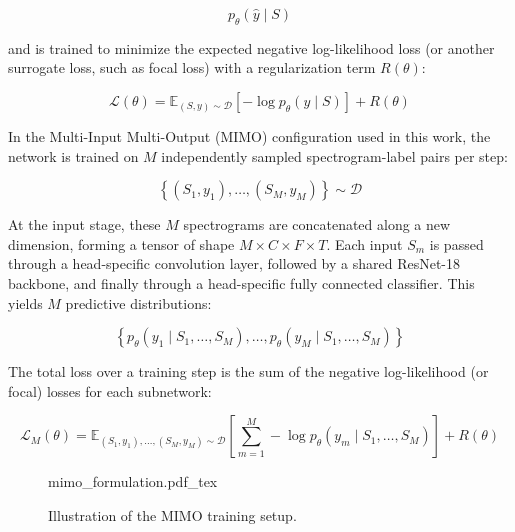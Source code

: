 \begin{equation}
p_{\theta}(\hat{y} \mid S)
\end{equation}

and is trained to minimize the expected negative log-likelihood loss (or another surrogate loss, such as focal loss) with a regularization term \( R(\theta) \):

\begin{equation}
\mathcal{L}(\theta) = \mathbb{E}_{(S, y) \sim \mathcal{D}} \left[ -\log p_{\theta}(y \mid S) \right] + R(\theta)
\end{equation}

In the Multi-Input Multi-Output (MIMO) configuration used in this work, the network is trained on \( M \) independently sampled spectrogram-label pairs per step:

\begin{equation}
\left\{(S_1, y_1), \ldots, (S_M, y_M)\right\} \sim \mathcal{D}
\end{equation}

At the input stage, these \( M \) spectrograms are concatenated along a new dimension, forming a tensor of shape \( M \times C \times F \times T \). Each input \( S_m \) is passed through a head-specific convolution layer, followed by a shared ResNet-18 backbone, and finally through a head-specific fully connected classifier. This yields \( M \) predictive distributions:

\begin{equation}
\left\{p_{\theta}(y_1 \mid S_1, \ldots, S_M), \ldots, p_{\theta}(y_M \mid S_1, \ldots, S_M)\right\}
\end{equation}

The total loss over a training step is the sum of the negative log-likelihood (or focal) losses for each subnetwork:

\begin{equation}
\mathcal{L}_M(\theta) = \mathbb{E}_{(S_1, y_1), \ldots, (S_M, y_M) \sim \mathcal{D}} \left[ \sum_{m=1}^{M} -\log p_{\theta}(y_m \mid S_1, \ldots, S_M) \right] + R(\theta)
\end{equation}

\begin{figure}[htb]
	\centering
    \def\svgwidth{400pt}
    \fontsize{8pt}{8pt}
 	{mimo_formulation.pdf_tex} 	 	
	\caption[Core concept of MIMO input-output mapping]{Illustration of the MIMO training setup.}
	\label{fig:mimo_formulation}
\end{figure}

